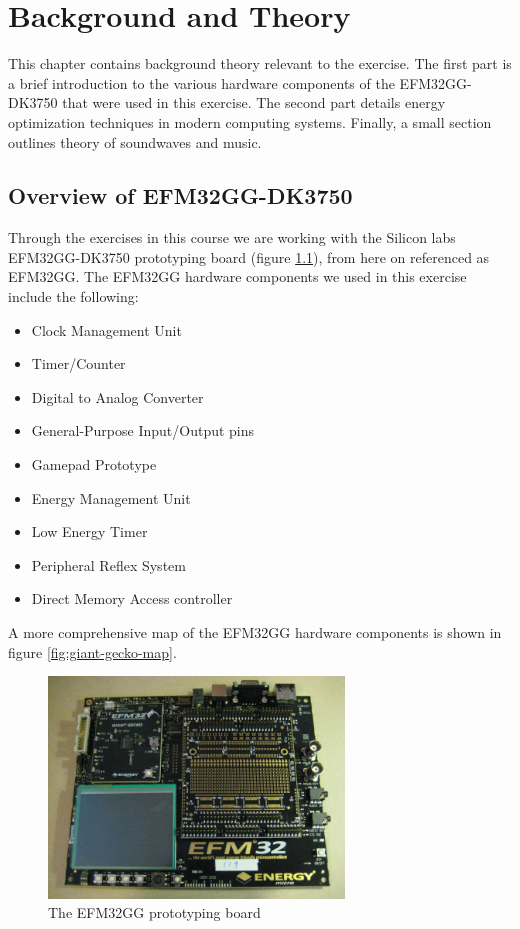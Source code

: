 \chapter{Background and Theory}
This chapter contains background theory relevant to the exercise. The first part is a brief introduction to the various hardware components of the EFM32GG-DK3750 that were used in this exercise. The second part details energy optimization techniques in modern computing systems. Finally, a small section outlines theory of soundwaves and music.

\section{Overview of EFM32GG-DK3750}
Through the exercises in this course we are working with the Silicon labs EFM32GG-DK3750 prototyping board (figure \ref{fig:efm-board}), from here on referenced as EFM32GG. The EFM32GG hardware components we used in this exercise include the following:
\begin{itemize}
	\item Clock Management Unit
	\item Timer/Counter
	\item Digital to Analog Converter
	\item General-Purpose Input/Output pins
	\item Gamepad Prototype
	\item Energy Management Unit
  \item Low Energy Timer
  \item Peripheral Reflex System
	\item Direct Memory Access controller
\end{itemize}
A more comprehensive map of the EFM32GG hardware components is shown in figure \ref{fig:giant-gecko-map}.

\begin{figure}[H]
  \centering
  \includegraphics[width=0.7\textwidth]{images/efm_board.jpg}
  \caption{The EFM32GG prototyping board}\label{fig:efm-board}
\end{figure}

